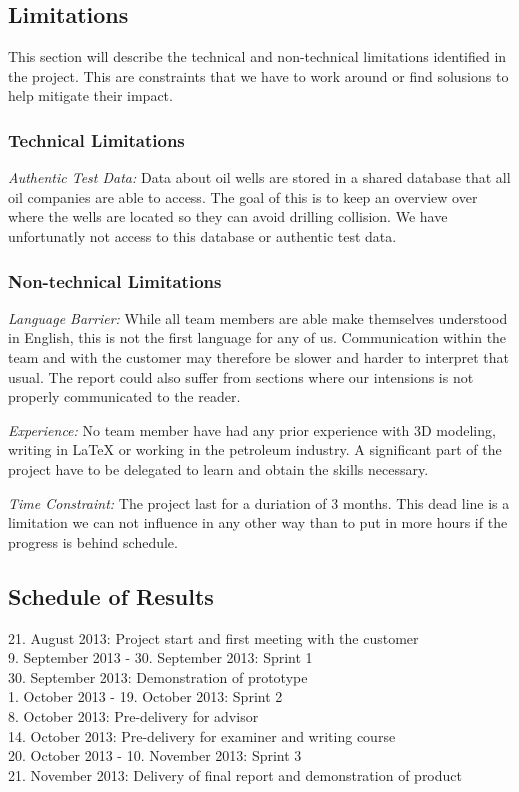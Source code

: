 \documentclass{report}
\begin{document}
\subsection{Limitations} \label{subsec:limitations}
This section will describe the technical and non-technical limitations identified in the project. This are constraints that we have to work around or find solusions to help mitigate their impact.

\subsubsection{Technical Limitations}

\emph{Authentic Test Data: } Data about oil wells are stored in a shared database that all oil companies are able to access. The goal of this is to keep an overview over where the wells are located so they can avoid drilling collision. We have unfortunatly not access to this database or authentic test data. 


\subsubsection{Non-technical Limitations}

\emph{Language Barrier: } While all team members are able make themselves understood in English, this is not the first language for any of us. Communication within the team and with the customer may therefore be slower and harder to interpret that usual. The report could also suffer from sections where our intensions is not properly communicated to the reader.

\emph{Experience: } No team member have had any prior experience with 3D modeling, writing in LaTeX or working in the petroleum industry. A significant part of the project have to be delegated to learn and obtain the skills necessary.

\emph{Time Constraint: } The project last for a duriation of 3 months. This dead line is a limitation we can not influence in any other way than to put in more hours if the progress is behind schedule. 



\subsection{Schedule of Results} \label{subsec:schedule_of_results}
21. August 2013: Project start and first meeting with the customer\\
9. September 2013 - 30. September 2013: Sprint 1\\
30. September 2013: Demonstration of prototype\\
1. October 2013 - 19. October 2013: Sprint 2\\
8. October 2013: Pre-delivery for advisor\\
14. October 2013: Pre-delivery for examiner and writing course\\
20. October 2013 - 10. November 2013: Sprint 3\\
21. November 2013: Delivery of final report and demonstration of product
\end{document}
